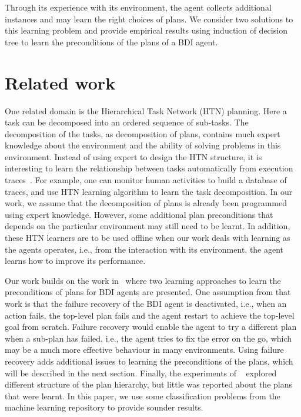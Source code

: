 \documentclass{article}
\begin{document}
Through its experience with its environment, the agent collects additional instances and may learn the right choices of plans. We consider two solutions to this learning problem and provide empirical results using induction of decision tree to learn the preconditions of the plans of a BDI agent.


\section{Related work}

One related domain is the Hierarchical Task Network (HTN) planning. Here a task can be decomposed into an ordered sequence of sub-tasks.  The decomposition of the tasks, as decomposition of plans, contains much expert knowledge about the environment and the ability of solving problems in this environment. Instead of using expert to design the HTN structure, it is interesting to learn the relationship between tasks automatically from execution traces~\cite{Zhuo09:Learning,Ilghami05:Learning,Hogg08:htnmaker}. For example, one can monitor human activities to build a database of traces, and use HTN learning algorithm to learn the task decomposition. In our work, we assume that the decomposition of plans is already been programmed using expert knowledge. However, some additional plan preconditions that depends on the particular environment may still need to be learnt. In addition, these HTN learners are to be used offline when our work deals with learning as the agents operates, i.e., from the interaction with its environment, the agent learns how to improve its performance.

Our work builds on the work in~\cite{Singh10:Learning} where two learning approaches to learn the preconditions of plans for BDI agents are presented.  One assumption from that work is that the failure recovery of the BDI agent is deactivated, i.e., when an action fails, the top-level plan fails and the agent restart to achieve the top-level goal from scratch. Failure recovery would enable the agent to try a different plan when a sub-plan has failed, i.e., the agent tries to fix the error on the go, which may be a much more effective behaviour in many environments. Using failure recovery adds additional issues to learning the preconditions of the plans, which will be described in the next section. Finally, the experiments of ~\cite{Singh10:Learning} explored different structure of the plan hierarchy, but little was reported about the plans that were learnt. In this paper, we use some classification problems from the machine learning repository to provide sounder results.
\end{document}
